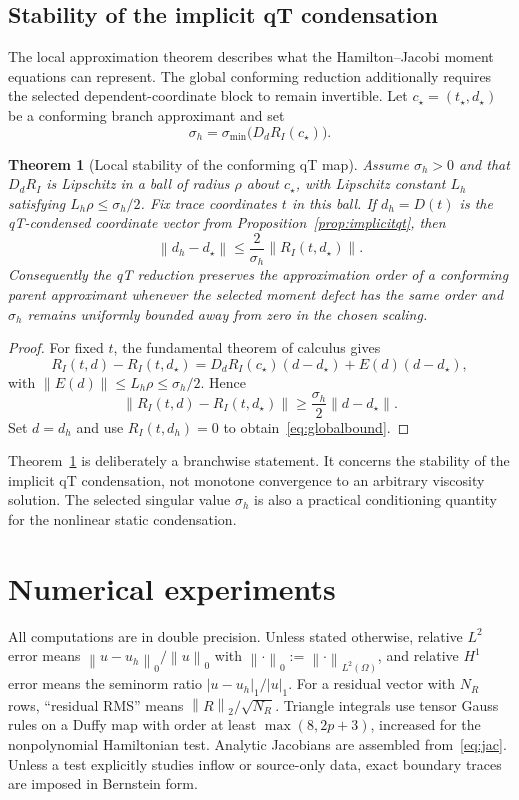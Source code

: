 \documentclass[preprint,12pt]{elsarticle}
\newtheorem{theorem}{Theorem}[section]
\newcommand{\norm}[1]{\left\lVert #1\right\rVert}
\newcommand{\abs}[1]{\left\lvert #1\right\rvert}
\begin{document}
\subsection{Stability of the implicit qT condensation}
The local approximation theorem describes what the Hamilton--Jacobi moment equations can represent.  The global conforming reduction additionally requires the selected dependent-coordinate block to remain invertible.  Let $c_\star=(t_\star,d_\star)$ be a conforming branch approximant and set
\begin{equation}\label{eq:sigmah}
 \sigma_h=\sigma_{\min}\bigl(D_dR_I(c_\star)\bigr).
\end{equation}

\begin{theorem}[Local stability of the conforming qT map]\label{thm:global}
Assume $\sigma_h>0$ and that $D_dR_I$ is Lipschitz in a ball of radius $\rho$ about $c_\star$, with Lipschitz constant $L_h$ satisfying $L_h\rho\le\sigma_h/2$.  Fix trace coordinates $t$ in this ball.  If $d_h=D(t)$ is the qT-condensed coordinate vector from Proposition~\ref{prop:implicitqt}, then
\begin{equation}\label{eq:globalbound}
 \norm{d_h-d_\star}
 \le \frac{2}{\sigma_h}\norm{R_I(t,d_\star)}.
\end{equation}
Consequently the qT reduction preserves the approximation order of a conforming parent approximant whenever the selected moment defect has the same order and $\sigma_h$ remains uniformly bounded away from zero in the chosen scaling.
\end{theorem}
\begin{proof}
For fixed $t$, the fundamental theorem of calculus gives
\[
 R_I(t,d)-R_I(t,d_\star)
 =D_dR_I(c_\star)(d-d_\star)+E(d)(d-d_\star),
\]
with $\norm{E(d)}\le L_h\rho\le\sigma_h/2$.  Hence
\[
 \norm{R_I(t,d)-R_I(t,d_\star)}
 \ge \frac{\sigma_h}{2}\norm{d-d_\star}.
\]
Set $d=d_h$ and use $R_I(t,d_h)=0$ to obtain~\eqref{eq:globalbound}.
\end{proof}

Theorem~\ref{thm:global} is deliberately a branchwise statement.  It concerns the stability of the implicit qT condensation, not monotone convergence to an arbitrary viscosity solution.  The selected singular value $\sigma_h$ is also a practical conditioning quantity for the nonlinear static condensation.

\section{Numerical experiments}\label{sec:numerics}
All computations are in double precision.  Unless stated otherwise, relative $L^2$ error means $\norm{u-u_h}_{0}/\norm{u}_{0}$ with $\norm{\cdot}_{0}:=\norm{\cdot}_{L^2(\Omega)}$, and relative $H^1$ error means the seminorm ratio $\abs{u-u_h}_{1}/\abs{u}_{1}$.  For a residual vector with $N_R$ rows, ``residual RMS'' means $\norm{R}_{2}/\sqrt{N_R}$.  Triangle integrals use tensor Gauss rules on a Duffy map with order at least $\max(8,2p+3)$, increased for the nonpolynomial Hamiltonian test.  Analytic Jacobians are assembled from~\eqref{eq:jac}.  Unless a test explicitly studies inflow or source-only data, exact boundary traces are imposed in Bernstein form.
\end{document}
